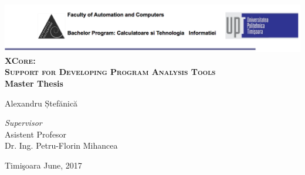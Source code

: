 \begin{titlepage}
	\begin{center}	
		\includegraphics[width=\textwidth]{../img/header.png}\\[4cm]
		
		{\huge \bfseries \textsc{XCore:\vspace{2.5mm}\\ Support for 
Developing Program\vspace{2.5mm} Analysis Tools}}
		\\[3cm]
		
		{\bfseries Master Thesis} \\[3cm]
								
		\begin{flushright}
				\large Alexandru Ștefănică \\[1cm]
		\end{flushright}
		\begin{flushleft}
			 \large
				\emph{Supervisor} \\
				Asistent Profesor \\
				Dr. Ing. Petru-Florin Mihancea \\[1cm]
		\end{flushleft}
		
		{\large {Timi\c{s}oara June, 2017}}
	\end{center}
\end{titlepage}
